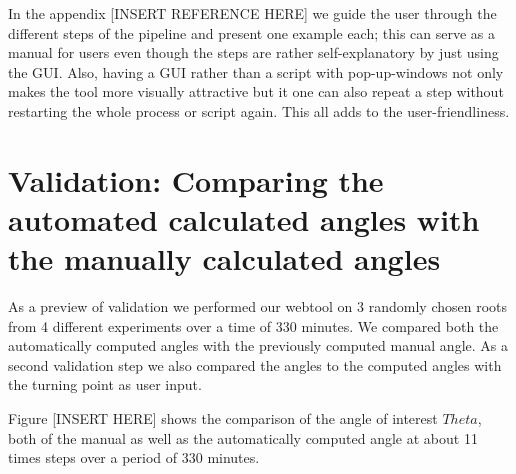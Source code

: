 In the appendix [INSERT REFERENCE HERE] we guide the user through the different steps of the pipeline and present one example each; this can serve as a manual for users even though the steps are rather self-explanatory by just using the GUI. Also, having a GUI rather than a script with pop-up-windows not only makes the tool more visually attractive but it one can also repeat a step without restarting the whole process or script again. This all adds to the user-friendliness.

\section{Validation: Comparing the automated calculated angles with the manually calculated angles}

As a preview of validation we performed our webtool on 3 randomly chosen roots from 4 different experiments over a time of 330 minutes. We compared both the automatically computed angles with the previously computed manual angle. As a second validation step we also compared the angles to the computed angles with the turning point as user input.

Figure [INSERT HERE] shows the comparison of the angle of interest \( Theta \), both of the manual as well as the automatically computed angle at about 11 times steps over a period of 330 minutes.




